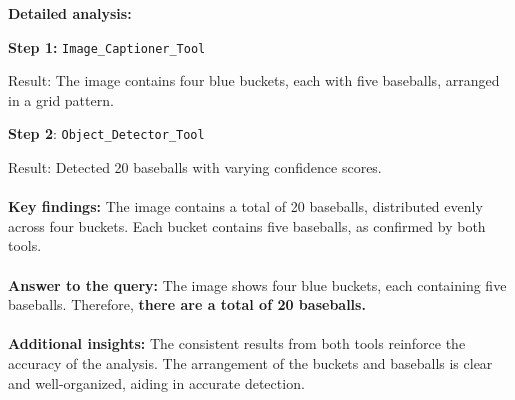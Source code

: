     \begin{answerbox}[Final Answer]
    \textbf{Detailed analysis:}
    
    \quad\textbf{Step 1:} \texttt{Image\_Captioner\_Tool}
    
    \quad\quad\quad\quad Result: The image contains four blue buckets, each with five baseballs, arranged in a grid pattern.
       
    \quad\textbf{Step 2}: \texttt{Object\_Detector\_Tool}
    
    \quad\quad\quad\quad Result: Detected 20 baseballs with varying confidence scores.
    \\\\
    \textbf{Key findings:}
    The image contains a total of 20 baseballs, distributed evenly across four buckets.
    Each bucket contains five baseballs, as confirmed by both tools.
    \\\\
    \textbf{Answer to the query:}
    The image shows four blue buckets, each containing five baseballs. Therefore, \textbf{there are a total of 20 baseballs.}
    \\\\
    \textbf{Additional insights:}
    The consistent results from both tools reinforce the accuracy of the analysis.
    The arrangement of the buckets and baseballs is clear and well-organized, aiding in accurate detection.
    \end{answerbox}
    